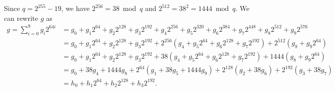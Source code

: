 \documentclass[a4paper, 12pt]{article}
\begin{document}
Since $q = 2^{255}-19$, we have $2^{256} = 38 \bmod q$ and $2^{512} = 38^2 = 1444 \bmod q$. We can rewrite $g$ as
\begin{align*}
  g  = \sum^{9}_{i=0} g_i 2^{64i} &= g_0 + g_1 2^{64} + g_2 2^{128} + g_3 2^{192} + g_4 2^{256} +   g_5 2^{320} + g_6 2^{384} + g_7 2^{448} + g_8 2^{512} + g_9 2^{576}\\
   &= g_0 + g_1 2^{64} + g_2 2^{128} + g_3 2^{192} + 2^{256} \left(  g_4 +   g_5 2^{64} + g_6 2^{128} + g_7 2^{192} \right) + 2^{512}\left(g_8  + g_9 2^{64} \right)\\
   &= g_0 + g_1 2^{64} + g_2 2^{128} + g_3 2^{192} + 38 \left(  g_4 +   g_5 2^{64} + g_6 2^{128} + g_7 2^{192} \right) + 1444 \left(g_8  + g_9 2^{64} \right)\\
   &= g_0 + 38 g_4 + 1444 g_8 + 2^{64} \left( g_1 + 38g_5 +1444g_9 \right)+ 2^{128} \left(  g_2 + 38 g_6\right) + 2^{192} \left( g_3 +38 g_7\right)\\
   & = h_0 + h_1 2^{64} + h_2 2^{128} + h_3 2^{192}.
\end{align*}
\end{document}
